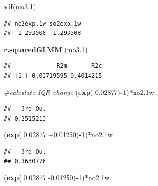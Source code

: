 \documentclass[12pt,]{article}
\newenvironment{Shaded}{\begin{snugshade}}{\end{snugshade}}
\newcommand{\CommentTok}[1]{\textcolor[rgb]{0.56,0.35,0.01}{\textit{#1}}}
\newcommand{\DecValTok}[1]{\textcolor[rgb]{0.00,0.00,0.81}{#1}}
\newcommand{\FloatTok}[1]{\textcolor[rgb]{0.00,0.00,0.81}{#1}}
\newcommand{\KeywordTok}[1]{\textcolor[rgb]{0.13,0.29,0.53}{\textbf{#1}}}
\newcommand{\NormalTok}[1]{#1}
\newcommand{\OperatorTok}[1]{\textcolor[rgb]{0.81,0.36,0.00}{\textbf{#1}}}
\begin{document}
\begin{Shaded}
\begin{Highlighting}[]
\KeywordTok{vif}\NormalTok{(mo3}\FloatTok{.1}\NormalTok{)}
\end{Highlighting}
\end{Shaded}

\begin{verbatim}
## no2exp.1w so2exp.1w 
##  1.293508  1.293508
\end{verbatim}

\begin{Shaded}
\begin{Highlighting}[]
\KeywordTok{r.squaredGLMM}\NormalTok{ (mo3}\FloatTok{.1}\NormalTok{)}
\end{Highlighting}
\end{Shaded}

\begin{verbatim}
##             R2m       R2c
## [1,] 0.02719595 0.4014215
\end{verbatim}

\begin{Shaded}
\begin{Highlighting}[]
\CommentTok{#calculate IQR change}
\NormalTok{(}\KeywordTok{exp}\NormalTok{( }\FloatTok{0.02877}\NormalTok{)}\OperatorTok{-}\DecValTok{1}\NormalTok{)}\OperatorTok{*}\NormalTok{no2}\FloatTok{.1}\NormalTok{w}
\end{Highlighting}
\end{Shaded}

\begin{verbatim}
##   3rd Qu. 
## 0.2515213
\end{verbatim}

\begin{Shaded}
\begin{Highlighting}[]
\NormalTok{(}\KeywordTok{exp}\NormalTok{( }\FloatTok{0.02877} \FloatTok{+0.01250}\NormalTok{)}\OperatorTok{-}\DecValTok{1}\NormalTok{)}\OperatorTok{*}\NormalTok{no2}\FloatTok{.1}\NormalTok{w}
\end{Highlighting}
\end{Shaded}

\begin{verbatim}
##   3rd Qu. 
## 0.3630776
\end{verbatim}

\begin{Shaded}
\begin{Highlighting}[]
\NormalTok{(}\KeywordTok{exp}\NormalTok{( }\FloatTok{0.02877} \FloatTok{-0.01250}\NormalTok{)}\OperatorTok{-}\DecValTok{1}\NormalTok{)}\OperatorTok{*}\NormalTok{no2}\FloatTok{.1}\NormalTok{w}
\end{Highlighting}
\end{Shaded}
\end{document}
